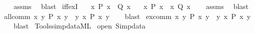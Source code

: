\begin{isabellebody}
%
\isadelimproof
\ \ %
\endisadelimproof
%
\isatagproof
{}\isamarkupfalse%
\ assms\ \isamarkupfalse%
\ blast%
\endisatagproof
{\isafoldproof}%
%
\isadelimproof
\isanewline
%
\endisadelimproof
\isanewline
{}\isamarkupfalse%
\ iff{\isacharunderscore}{\kern0pt}exI{\isacharcolon}{\kern0pt}\isanewline
\ \ \ {\isachardoublequoteopen}{\isasymAnd}x{\isachardot}{\kern0pt}\ P\ x\ {\isacharequal}{\kern0pt}\ Q\ x{\isachardoublequoteclose}\isanewline
\ \ \ {\isachardoublequoteopen}{\isacharparenleft}{\kern0pt}{\isasymexists}x{\isachardot}{\kern0pt}\ P\ x{\isacharparenright}{\kern0pt}\ {\isacharequal}{\kern0pt}\ {\isacharparenleft}{\kern0pt}{\isasymexists}x{\isachardot}{\kern0pt}\ Q\ x{\isacharparenright}{\kern0pt}{\isachardoublequoteclose}\isanewline
%
\isadelimproof
\ \ %
\endisadelimproof
%
\isatagproof
{}\isamarkupfalse%
\ assms\ \isamarkupfalse%
\ blast%
\endisatagproof
{\isafoldproof}%
%
\isadelimproof
\isanewline
%
\endisadelimproof
\isanewline
{}\isamarkupfalse%
\ all{\isacharunderscore}{\kern0pt}comm{\isacharcolon}{\kern0pt}\ {\isachardoublequoteopen}{\isacharparenleft}{\kern0pt}{\isasymforall}x\ y{\isachardot}{\kern0pt}\ P\ x\ y{\isacharparenright}{\kern0pt}\ {\isacharequal}{\kern0pt}\ {\isacharparenleft}{\kern0pt}{\isasymforall}y\ x{\isachardot}{\kern0pt}\ P\ x\ y{\isacharparenright}{\kern0pt}{\isachardoublequoteclose}\isanewline
%
\isadelimproof
\ \ %
\endisadelimproof
%
\isatagproof
{}\isamarkupfalse%
\ blast%
\endisatagproof
{\isafoldproof}%
%
\isadelimproof
\isanewline
%
\endisadelimproof
\isanewline
{}\isamarkupfalse%
\ ex{\isacharunderscore}{\kern0pt}comm{\isacharcolon}{\kern0pt}\ {\isachardoublequoteopen}{\isacharparenleft}{\kern0pt}{\isasymexists}x\ y{\isachardot}{\kern0pt}\ P\ x\ y{\isacharparenright}{\kern0pt}\ {\isacharequal}{\kern0pt}\ {\isacharparenleft}{\kern0pt}{\isasymexists}y\ x{\isachardot}{\kern0pt}\ P\ x\ y{\isacharparenright}{\kern0pt}{\isachardoublequoteclose}\isanewline
%
\isadelimproof
\ \ %
\endisadelimproof
%
\isatagproof
{}\isamarkupfalse%
\ blast%
\endisatagproof
{\isafoldproof}%
%
\isadelimproof
\isanewline
%
\endisadelimproof
%
\isadelimML
\isanewline
%
\endisadelimML
%
\isatagML
{}\isamarkupfalse%
\ {\isacartoucheopen}Tools{\isacharslash}{\kern0pt}simpdata{\isachardot}{\kern0pt}ML{\isacartoucheclose}\isanewline
{}\isamarkupfalse%
\ {\isacartoucheopen}open\ Simpdata{\isacartoucheclose}\isanewline
\isanewline

\end{isabellebody}
